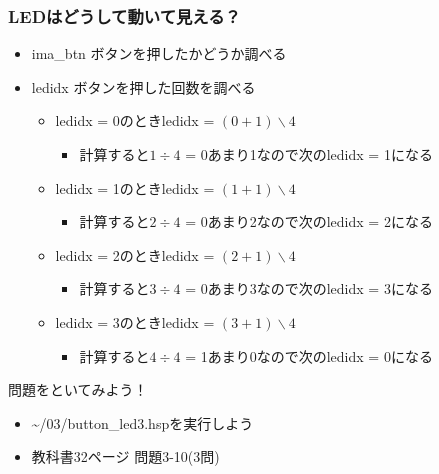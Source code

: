 \begin{frame}
  \frametitle{LEDはどうして動いて見える？}
  \begin{itemize}
    \item ima\_btn ボタンを押したかどうか調べる
    \item ledidx ボタンを押した回数を調べる
    \begin{itemize}
      \item ledidx = 0のときledidx = $(0+1)\backslash4$
      \begin{itemize}
        \item 計算すると$1\div4$ = 0あまり1なので次のledidx = 1になる
      \end{itemize}
      \item ledidx = 1のときledidx = $(1+1)\backslash4$ 
      \begin{itemize}
        \item 計算すると$2\div4$ = 0あまり2なので次のledidx = 2になる 
      \end{itemize}
      \item ledidx = 2のときledidx = $(2+1)\backslash4$ 
      \begin{itemize}
        \item 計算すると$3\div4$ = 0あまり3なので次のledidx = 3になる
      \end{itemize}
      \item ledidx = 3のときledidx = $(3+1)\backslash4$ 
      \begin{itemize}
        \item 計算すると$4\div4$ = 1あまり0なので次のledidx = 0になる
      \end{itemize}
    \end{itemize}
  \end{itemize}
\end{frame}

\begin{frame}
  \begin{exampleblock}{問題をといてみよう！}
    \begin{itemize}
      \item \sim/03/button\_led3.hspを実行しよう
      \item 教科書32ページ 問題3-10(3問)
    \end{itemize}
  \end{exampleblock} 
\end{frame}